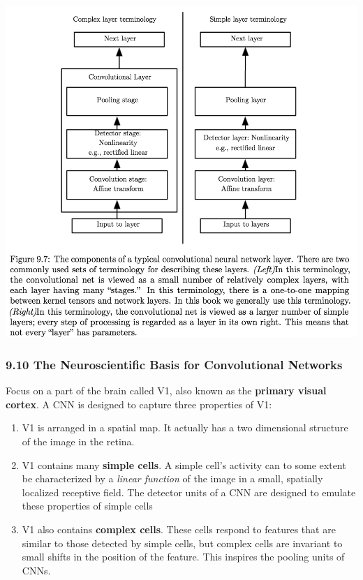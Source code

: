 \documentclass[12pt]{article}
\begin{document}
\begin{center}
  \includegraphics[scale=0.75]{fig9_7}
\end{center}

\subsubsection*{9.10 The Neuroscientific Basis for Convolutional Networks}

Focus on a part of the brain called V1, also known as the
\textbf{primary visual cortex}. A CNN is designed to capture
three properties of V1:

\begin{enumerate}
\item V1 is arranged in a spatial map. It actually has a two
  dimensional structure of the image in the retina.
\item V1 contains many \textbf{simple cells}. A simple cell's
  activity can to some extent be characterized by a
  \textit{linear function} of the image in a small, spatially
  localized receptive field. The detector units of a CNN are
  designed to emulate these properties of simple cells
\item V1 also contains \textbf{complex cells}. These cells respond
  to features that are similar to those detected by simple cells,
  but complex cells are invariant to small shifts in the position
  of the feature. This inspires the pooling units of CNNs.
\end{enumerate}
\end{document}

